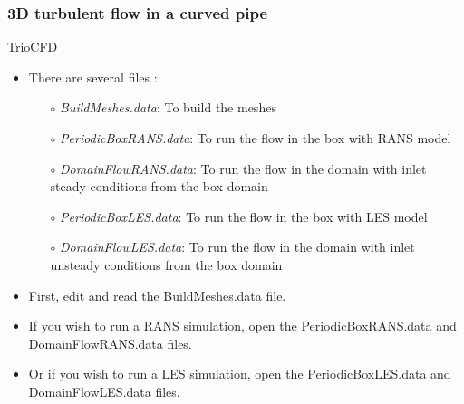 \documentclass[10pt, hyperref={unicode=true,pdfusetitle, bookmarks=true,bookmarksnumbered=false,bookmarksopen=false, breaklinks=false,pdfborder={0 0 1},backref=true,colorlinks=true,linkcolor=darkblue,pageanchor}]{beamer}
\begin{document}
\begin{frame}
\frametitle{3D turbulent flow in a curved pipe}
\begin{block}{TrioCFD}

\begin{itemize}
\item There are several files :\\
    \begin{itemize}
    \item [$\circ$] \textit{BuildMeshes.data}: To build the meshes\\
    \item [$\circ$] \textit{PeriodicBoxRANS.data}: To run the flow in the box with RANS model\\
    \item [$\circ$] \textit{DomainFlowRANS.data}: To run the flow in the domain with inlet steady conditions from the box domain\\
    \item [$\circ$] \textit{PeriodicBoxLES.data}: To run the flow in the box with LES model\\
    \item [$\circ$] \textit{DomainFlowLES.data}: To run the flow in the domain with inlet unsteady conditions from the box domain
    \end{itemize}

\item First, edit and read the BuildMeshes.data file.

\item If you wish to run a RANS simulation, open the PeriodicBoxRANS.data and DomainFlowRANS.data files.

\item Or if you wish to run a LES simulation, open the PeriodicBoxLES.data and DomainFlowLES.data files.
\end{itemize}

\end{block}
\end{frame}
\end{document}
